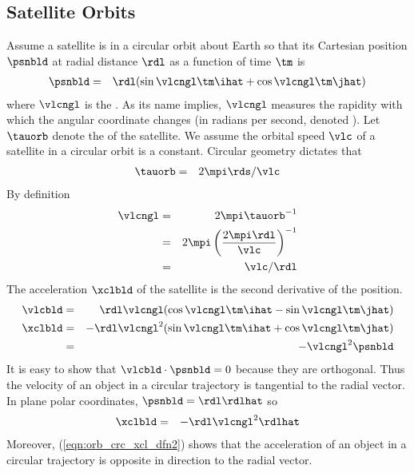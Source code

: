 \documentclass[12pt]{article}
\begin{document}
\subsection[Satellite Orbits]{Satellite Orbits}\label{sxn:stl_orb}
Assume a satellite is in a circular orbit about Earth
so that its Cartesian position $\psnbld$ at radial distance $\rdl$ as
a function of time $\tm$ is 
\begin{eqnarray}
\psnbld & = & \rdl (\sin \vlcngl \tm \ihat + \cos \vlcngl \tm \jhat)
\label{eqn:orb_crc_psn_dfn}
\end{eqnarray}
where $\vlcngl$ is the .
As its name implies, $\vlcngl$ measures the rapidity with which
the angular coordinate changes (in radians per second, denoted \xs).
Let $\tauorb$ denote the  of the satellite.
We assume the orbital speed $\vlc$ of a satellite in a circular orbit
is a constant.
Circular geometry dictates that
\begin{eqnarray}
\tauorb & = & 2 \mpi \rds / \vlc
\label{eqn:tau_orb_dfn}
\end{eqnarray}
By definition
\begin{eqnarray}
\vlcngl & = & 2\mpi \tauorb^{-1} \nonumber \\
& = & 2\mpi \left( \frac{2\mpi \rdl}{\vlc} \right)^{-1} \nonumber \\
& = & \vlc / \rdl
\label{eqn:vlc_ngl_dfn}
\end{eqnarray}
The acceleration $\xclbld$ of the satellite is the second derivative
of the position.
\begin{eqnarray}
\label{eqn:orb_crc_vlc_dfn}
\vlcbld & = & \rdl \vlcngl (\cos \vlcngl \tm \ihat - \sin \vlcngl \tm \jhat) \\
\label{eqn:orb_crc_xcl_dfn}
\xclbld & = & - \rdl \vlcngl^{2} (\sin \vlcngl \tm \ihat + \cos \vlcngl
\tm \jhat) \\
& = & - \vlcngl^{2} \psnbld
\end{eqnarray}
It is easy to show that $\vlcbld \cdot \psnbld = 0$ because they are
orthogonal. 
Thus the velocity of an object in a circular trajectory is tangential
to the radial vector.
In plane polar coordinates, $\psnbld = \rdl \rdlhat$ so
\begin{eqnarray}
\xclbld & = & - \rdl \vlcngl^{2} \rdlhat
\label{eqn:orb_crc_xcl_dfn2}
\end{eqnarray}
Moreover, (\ref{eqn:orb_crc_xcl_dfn2}) shows that the acceleration of
an object in a circular trajectory is opposite in direction to the
radial vector. 
\end{document}
